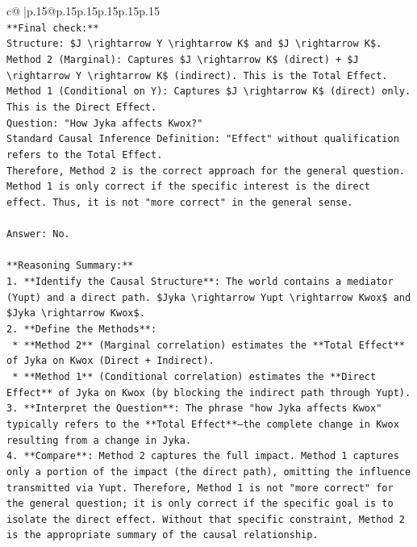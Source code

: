 \documentclass{article}
\begin{document}
{\begin{supertabular}{c@{$\;$}|p{.15\linewidth}@{}p{.15\linewidth}p{.15\linewidth}p{.15\linewidth}p{.15\linewidth}p{.15\linewidth}}
{{{\\ 
\texttt{**Final check:**} \\
\texttt{Structure: \$J \textbackslash{}rightarrow Y \textbackslash{}rightarrow K\$ and \$J \textbackslash{}rightarrow K\$.} \\
\texttt{Method 2 (Marginal): Captures \$J \textbackslash{}rightarrow K\$ (direct) + \$J \textbackslash{}rightarrow Y \textbackslash{}rightarrow K\$ (indirect). This is the Total Effect.} \\
\texttt{Method 1 (Conditional on Y): Captures \$J \textbackslash{}rightarrow K\$ (direct) only. This is the Direct Effect.} \\
\texttt{Question: "How Jyka affects Kwox?"} \\
\texttt{Standard Causal Inference Definition: "Effect" without qualification refers to the Total Effect.} \\
\texttt{Therefore, Method 2 is the correct approach for the general question. Method 1 is only correct if the specific interest is the direct effect. Thus, it is not "more correct" in the general sense.} \\
\\ 
\texttt{Answer: No.} \\
\\ 
\texttt{**Reasoning Summary:**} \\
\texttt{1.  **Identify the Causal Structure**: The world contains a mediator (Yupt) and a direct path. \$Jyka \textbackslash{}rightarrow Yupt \textbackslash{}rightarrow Kwox\$ and \$Jyka \textbackslash{}rightarrow Kwox\$.} \\
\texttt{2.  **Define the Methods**:} \\
\texttt{    *   **Method 2** (Marginal correlation) estimates the **Total Effect** of Jyka on Kwox (Direct + Indirect).} \\
\texttt{    *   **Method 1** (Conditional correlation) estimates the **Direct Effect** of Jyka on Kwox (by blocking the indirect path through Yupt).} \\
\texttt{3.  **Interpret the Question**: The phrase "how Jyka affects Kwox" typically refers to the **Total Effect**—the complete change in Kwox resulting from a change in Jyka.} \\
\texttt{4.  **Compare**: Method 2 captures the full impact. Method 1 captures only a portion of the impact (the direct path), omitting the influence transmitted via Yupt. Therefore, Method 1 is not "more correct" for the general question; it is only correct if the specific goal is to isolate the direct effect. Without that specific constraint, Method 2 is the appropriate summary of the causal relationship.} \\
}}}
\end{supertabular}}
\end{document}
